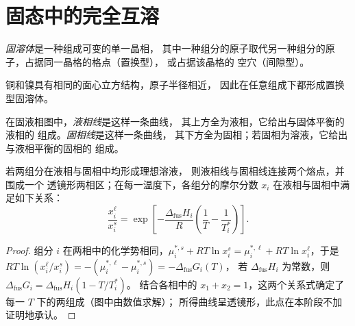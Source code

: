 \section{固态中的完全互溶}

\begin{definition}[固溶体]\label{def:b2:solid-liquid-diagrams:solid-solution}
\emph{固溶体}是一种组成可变的单一晶相，
其中一种组分的原子取代另一种组分的原子，占据同一晶格的格点（置换型），
或占据该晶格的
空穴（间隙型）。
\end{definition}

铜和镍具有相同的面心立方结构，原子半径相近，
因此在任意组成下都形成置换型固溶体。

\begin{definition}[液相线与固相线]\label{def:b2:solid-liquid-diagrams:liquidus}
在固液相图中，\emph{液相线}是这样一条曲线，
其上方全为液相，它给出与固体平衡的液相的
组成。\emph{固相线}是这样一条曲线，
其下方全为固相；若固相为溶液，它给出与液相平衡的固相的
组成。
\end{definition}

\begin{proposition}[透镜]\label{prop:b2:solid-liquid-diagrams:lens}
若两组分在液相与固相中均形成理想溶液，
则液相线与固相线连接两个熔点，并围成一个
透镜形两相区；在每一温度下，各组分的摩尔分数 $x_i$
在液相与固相中满足如下关系：
\[
  \frac{x_i^{\ell}}{x_i^{s}} = \exp\left[-\frac{\Delta_{\text{fus}}H_i}{R}\left(\frac1T - \frac1{T_i^*}\right)\right] .
\]
\end{proposition}

\begin{proof}
组分 $i$ 在两相中的化学势相同，$\mu_i^{*,s} +
RT\ln x_i^s = \mu_i^{*,\ell} + RT\ln x_i^\ell$，于是 $RT\ln(x_i^\ell/x_i^s) =
-(\mu_i^{*,\ell} - \mu_i^{*,s}) = -\Delta_{\text{fus}}G_i(T)$，
若 $\Delta_{\text{fus}}H_i$ 为常数，则 $\Delta_{\text{fus}}G_i = \Delta_{\text{fus}}H_i(1 - T/T_i^*)$。
结合各相中的 $x_1 + x_2 = 1$，这两个关系式确定了
每一 $T$ 下的两组成（图中由数值求解）；
所得曲线呈透镜形，此点在本阶段不加证明地承认。
\end{proof}

